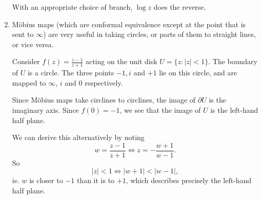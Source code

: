 \documentclass[a4paper]{article}
\begin{document}
\begin{eg}
\begin{enumerate}
\begin{center}
      \end{center}
      With an appropriate choice of branch, $\log z$ does the reverse.
    \item M\"obius maps (which are conformal equivalence except at the point that is sent to $\infty$) are very useful in taking circles, or parts of them to straight lines, or vice versa.

      Consider $f(z) = \frac{z - 1}{z + 1}$ acting on the unit disk $U = \{z: |z| < 1\}$. The boundary of $U$ is a circle. The three points $-1, i$ and $+1$ lie on this circle, and are mapped to $\infty$, $i$ and $0$ respectively.

      Since M\"obius maps take circlines to circlines, the image of $\partial U$ is the imaginary axis. Since $f(0) = -1$, we see that the image of $U$ is the left-hand half plane.
      \begin{center}
      \end{center}
      We can derive this alternatively by noting
      \[
        w = \frac{z - 1}{z + 1} \Leftrightarrow z = -\frac{w + 1}{w - 1}.
      \]
      So
      \[
        |z| < 1 \Leftrightarrow |w + 1| < |w - 1|,
      \]
      ie. $w$ is closer to $-1$ than it is to $+1$, which describes precisely the left-hand half plane.


\end{enumerate}
\end{eg}
\end{document}
